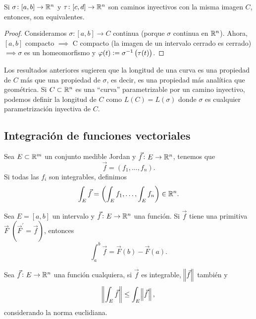 \begin{prop}
    Si $\sigma \colon [a, b] \to \mathbb{R}^n$ y $\tau \colon [c,d] \to \mathbb{R}^n$ son caminos inyectivos con la misma imagen $C$, entonces, son equivalentes.
\end{prop}

\begin{proof}
    Consideramos $\sigma \colon [a,b] \to C$ continua (porque $\sigma$ continua en $\mathbb{R}^n$). Ahora, $[a, b]$ compacto $\implies$ C compacto
    (la imagen de un intervalo cerrado es cerrado) $\implies \sigma$ es un homeomorfismo y $\varphi(t) := \sigma^{-1}\left( \tau(t) \right)$.
\end{proof}

\begin{obs}
    Los resultados anteriores sugieren que la longitud de una curva es una propiedad de $C$ más que una propiedad de $\sigma$, es decir,
    es una propiedad más analítica que geométrica. Si $C \subset \mathbb{R}^n$ es una ``curva'' parametrizable por un camino inyectivo,
    podemos definir la longitud de $C$ como $L(C) = L(\sigma)$ donde $\sigma$ es cualquier parametrización inyectiva de $C$.
\end{obs}

\subsection*{Integración de funciones vectoriales}

\begin{defi*}
    Sea $E \subset \mathbb{R}^m$ un conjunto medible Jordan y $\vec{f} \colon E \to \mathbb{R}^n$, tenemos que
    \[
        \vec{f} = \left( f_1,\dots, f_n \right).
    \]
    Si todas las $f_i$ son integrables, definimos
    \[
        \int_E \vec{f} = \left( \int_E f_1 , \dots, \int_E f_n \right) \in \mathbb{R}^n.
    \]
\end{defi*}

\begin{prop*}\label{prop:regla_barrow}
    Sea $E = [a, b]$ un intervalo y $\vec{f} \colon E \to \mathbb{R}^n$ una función. Si $\vec{f}$ tiene una primitiva $\vec{F}$
    $\left( \vec{F}^\prime = \vec{f}\right)$, entonces
    \[
        \int^b_a \vec{f} = \vec{F}(b) - \vec{F}(a).
    \]
\end{prop*}

\begin{prop*}
    Sea $\vec{f} \colon E \to \mathbb{R}^n$ una función cualquiera, si $\vec{f}$ es integrable, $\norm{\vec{f}}$ tambi\'en y
    \[
        \norm{\int_E \vec{f}} \leq \int_E \norm{\vec{f}},
    \]
    considerando la norma euclidiana.
\end{prop*}

